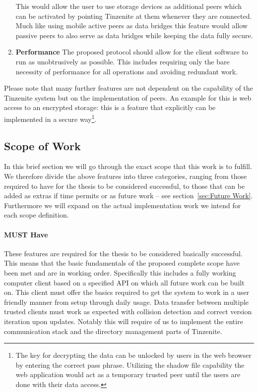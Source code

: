 \begin{enumerate}
    This would allow the user to use storage devices as additional peers which can be activated by pointing Tinzenite at them whenever they are connected.
    Much like using mobile active peers as data bridges this feature would allow passive peers to also serve as data bridges while keeping the data fully secure.
\item \textbf{Performance}
    The proposed protocol should allow for the client software to run as unobtrusively as possible.
    This includes requiring only the bare necessity of performance for all operations and avoiding redundant work.
\end{enumerate}

Please note that many further features are not dependent on the capability of the Tinzenite system but on the implementation of peers.
An example for this is web access to an encrypted storage: this is a feature that explicitly can be implemented in a secure way\footnote{The key for decrypting the data can be unlocked by users in the web browser by entering the correct pass phrase. Utilizing the shadow file capability the web application would act as a temporary trusted peer until the users are done with their data access.}.

\subsection{Scope of Work}
\label{sub:Scope of Work}

In this brief section we will go through the exact scope that this work is to fulfill.
We therefore divide the above features into three categories, ranging from those required to have for the thesis to be considered successful, to those that can be added as extras if time permits or as future work -- see section~\ref{sec:Future Work}.
Furthermore we will expand on the actual implementation work we intend for each scope definition.

\paragraph{MUST Have}
\label{par:MUST Have}
These features are required for the thesis to be considered basically successful.
This means that the basic fundamentals of the proposed complete scope have been met and are in working order.
Specifically this includes a fully working computer client based on a specified API on which all future work can be built on.
This client must offer the basics required to get the system to work in a user friendly manner from setup through daily usage.
Data transfer between multiple trusted clients must work as expected with collision detection and correct version iteration upon updates.
Notably this will require of us to implement the entire communication stack and the directory management parts of Tinzenite.

